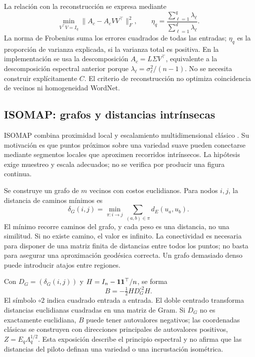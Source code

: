 La relación con la reconstrucción se expresa mediante
\begin{equation}
 \min_{V^\top V=I_q}\|A_c-A_cVV^\top\|_F^2,
 \qquad
 \eta_q=\frac{\sum_{\ell=1}^{q}\lambda_\ell}{\sum_{\ell=1}^{d}\lambda_\ell}.
\end{equation}
La norma de Frobenius suma los errores cuadrados de todas las entradas; $\eta_q$ es la proporción de varianza explicada, si la varianza total es positiva. En la implementación se usa la descomposición $A_c=L\Sigma V^\top$, equivalente a la descomposición espectral anterior porque $\lambda_\ell=\sigma_\ell^2/(n-1)$. No se necesita construir explícitamente $C$. El criterio de reconstrucción no optimiza coincidencia de vecinos ni homogeneidad WordNet.

\subsection{ISOMAP: grafos y distancias intrínsecas}
ISOMAP combina proximidad local y escalamiento multidimensional clásico \parencite{tenenbaum2000}. Su motivación es que puntos próximos sobre una variedad suave pueden conectarse mediante segmentos locales que aproximen recorridos intrínsecos. La hipótesis exige muestreo y escala adecuados; no se verifica por producir una figura continua.

Se construye un grafo de $m$ vecinos con costos euclidianos. Para nodos $i,j$, la distancia de caminos mínimos es
\begin{equation}
 \delta_G(i,j)=\min_{\pi:i\to j}\sum_{(a,b)\in\pi}d_E(u_a,u_b).
\end{equation}
El mínimo recorre caminos del grafo, y cada peso es una distancia, no una similitud. Si no existe camino, el valor es infinito. La conectividad es necesaria para disponer de una matriz finita de distancias entre todos los puntos; no basta para asegurar una aproximación geodésica correcta. Un grafo demasiado denso puede introducir atajos entre regiones.

Con $D_G=(\delta_G(i,j))$ y $H=I_n-\mathbf{1}\mathbf{1}^\top/n$, se forma
\begin{equation}
 B=-\tfrac12 H D_G^{\circ2}H.
\end{equation}
El símbolo $\circ2$ indica cuadrado entrada a entrada. El doble centrado transforma distancias euclidianas cuadradas en una matriz de Gram. Si $D_G$ no es exactamente euclidiana, $B$ puede tener autovalores negativos; las coordenadas clásicas se construyen con direcciones principales de autovalores positivos, $Z=E_q\Lambda_q^{1/2}$. Esta exposición describe el principio espectral y no afirma que las distancias del piloto definan una variedad o una incrustación isométrica.

